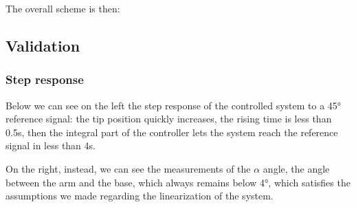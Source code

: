 The overall scheme is then:


\subsection{Validation}

\subsubsection{Step response}

Below we can see on the left the step response of the controlled system to a 45° reference signal: the tip position quickly increases, the rising time is less than 0.5s, then the integral part of the controller lets the system reach the reference signal in less than 4s.

On the right, instead, we can see the measurements of the $\alpha$ angle, the angle between the arm and the base, which always remains below 4°, which satisfies the assumptions we made regarding the linearization of the system.

